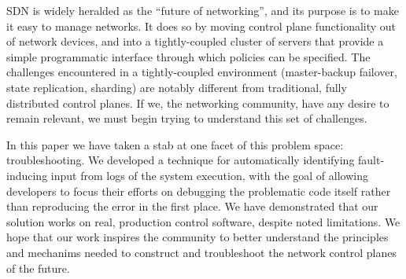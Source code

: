 
SDN is widely heralded as the ``future of networking'', and its purpose is to make
it easy to manage networks. It does so by moving control plane functionality out of
network devices, and into a tightly-coupled cluster of servers that provide a simple
programmatic interface through which policies can be specified. The challenges encountered
in a tightly-coupled environment (master-backup failover, state replication, sharding) are
notably different from traditional, fully distributed control planes. If we,
the networking community, have any desire to remain relevant, we must begin trying
to understand this set of challenges.

In this paper we have taken a stab at one facet of this problem space:
troubleshooting. We developed a technique for automatically
identifying fault-inducing input from logs of the system execution, with the
goal of allowing developers to focus their efforts on debugging the problematic
code itself rather than reproducing the error in the first place. We have
demonstrated that our solution works on real, production control software,
despite noted limitations. We hope that our work inspires the community to
better understand the principles and mechanims needed to construct and
troubleshoot the network control planes of the future.

